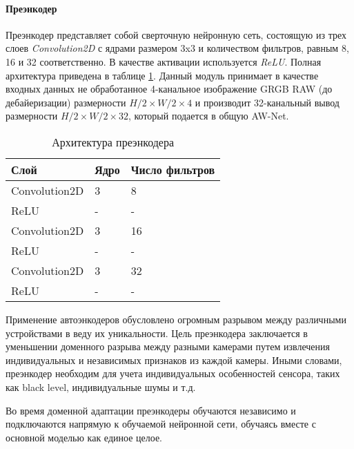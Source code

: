 \paragraph{Преэнкодер}

Преэнкодер представляет собой сверточную нейронную сеть, состоящую из трех слоев \textit{Convolution2D} с ядрами размером 3x3 и количеством фильтров, равным 8, 16 и 32 соответственно. В качестве активации используется \textit{ReLU}. Полная архитектура приведена в таблице \ref{pre-encoder-arch}. Данный модуль принимает в качестве входных данных не обработанное 4-канальное изображение GRGB RAW (до дебайеризации) размерности $H/2\times W/2\times 4$ и производит 32-канальный вывод размерности $H/2\times W/2\times 32$, который подается в общую AW-Net.

\begin{table}[H]
    \caption{Архитектура преэнкодера}\label{pre-encoder-arch}
    \begin{tabular}{|p{5cm}|p{3cm}|p{3cm}|}
        \hline
        {Слой} & {Ядро} & {Число фильтров} \\
        \hline
        Convolution2D & 3 & 8 \\
        \hline
        ReLU & - & - \\
        \hline
        Convolution2D & 3 & 16 \\
        \hline
        ReLU & - & - \\
        \hline
        Convolution2D & 3 & 32 \\
        \hline
        ReLU & - & - \\
        \hline
    \end{tabular}
\end{table}

Применение автоэнкодеров обусловлено огромным разрывом между различными устройствами в веду их уникальности. Цель преэнкодера заключается в уменьшении доменного разрыва между разными камерами путем извлечения индивидуальных и независимых признаков из каждой камеры. Иными словами, преэнкодер необходим для учета индивидуальных особенностей сенсора, таких как black level, индивидуальные шумы и т.д.

Во время доменной адаптации преэнкодеры обучаются независимо и подключаются напрямую к обучаемой нейронной сети, обучаясь вместе с основной моделью как единое целое.